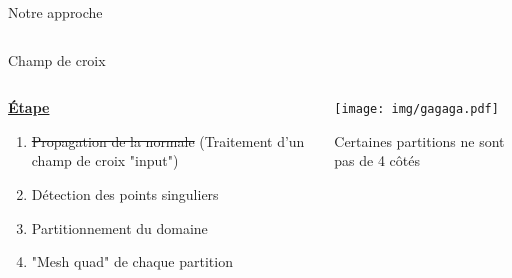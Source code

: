 \begin{frame}{Notre approche}
\begin{columns}
\begin{column}{0.33\textwidth}
        \caption{\footnotesize Champ de croix}
        \end{column}
    \end{columns}
\pause[2]
    \begin{columns}
        \begin{column}{0.5\textwidth}
            \underline{\bf \'Etape}\\
            \begin{enumerate}
                \item \sout{Propagation de la normale} (Traitement d'un champ de croix "input")\\
                \item Détection des points singuliers
                \item Partitionnement du domaine
                \item "Mesh quad" de chaque partition
            \end{enumerate}
        \end{column}
        \begin{column}{0.5\textwidth}
             \centering
            \texttt{[image: img/gagaga.pdf]}
            \vspace{0.2cm}
            \caption{\footnotesize Certaines partitions ne sont pas de 4 côtés}
            \vspace{0.5cm}
        \end{column}
    \end{columns}
\end{frame}





